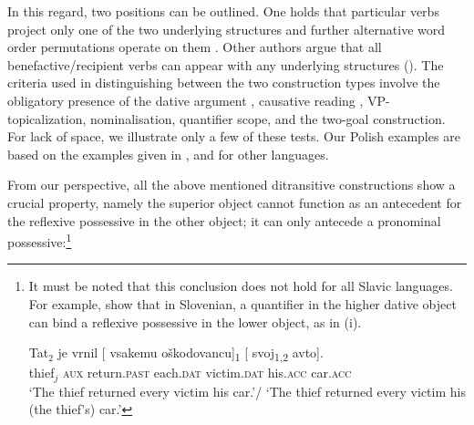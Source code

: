 \documentclass[output=paper,modfonts,nonflat
]{langsci/langscibook}
\begin{document}
\noindent In this regard, two positions can be outlined. One holds that particular verbs project only one of the two underlying structures and further alternative word order permutations operate on them \citep{dvorak2010}. Other authors argue that all benefactive/recipient verbs can appear with any underlying structures (\citealt{gracanin2006,marvinstegovec2012}). The criteria used in distinguishing between the two construction types involve the obligatory presence of the dative argument , causative reading , VP-topicalization, nominalisation, quantifier scope, and the two-goal construction. For lack of space, we illustrate only a few of these tests. Our Polish examples are based on the examples given in \cite{gracanin2006,dvorak2010}, and \cite{marvinstegovec2012} for other languages.

\ea \label{ex:witkos:24}
	\z
\z

\ea \label{ex:witkos:25}
	\z
\z

\noindent From our perspective, all the above mentioned ditransitive constructions show a crucial property, namely the superior object cannot function as an antecedent for the reflexive possessive in the other object; it can only antecede a pronominal possessive:\footnote{\label{fn20}It must be noted that this conclusion does not hold for all Slavic languages. For example, \cite{marvinstegovec2012} show that in Slovenian, a quantifier in the higher dative object can bind a reflexive possessive in the lower object, as in (i). 

\ea
\gll Tat$_2$ je vrnil [\hspace{-2pt} vsakemu oškodovancu]\textsubscript{1} [\hspace{-2pt} svoj\textsubscript{1,2} avto].\\
thief$_j$ \textsc{aux} return.\textsc{past} {} each.\textsc{dat} victim.\textsc{dat} {} his.\textsc{acc} car.\textsc{acc}\\
\glt `The thief returned every victim his car.'/ `The thief returned every victim his (the thief's) car.'
\z}
\end{document}
